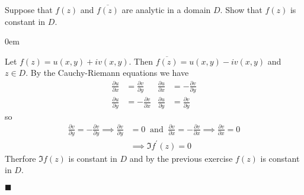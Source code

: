 \documentclass[12pt]{article}
\renewcommand{\qed}{\hfill$\blacksquare$}
\renewenvironment{proof}{\vspace{1em}\begin{addmargin}[2em]{0em}\begin{newproof}}{\end{newproof}\end{addmargin}\qed}
\newenvironment{exercise}[2][Exercise]{\begin{trivlist}
\item[\hskip \labelsep {\bfseries #1} \hskip \labelsep {\bfseries #2.}]}{\end{trivlist}}
\begin{document}
\newpage
\begin{exercise}{11}
	Suppose that $f(z)$ and $\overline{f(z)}$ are analytic in a domain $D$. Show that $f(z)$ is constant in $D$.
\end{exercise}
\begin{proof} Let $f(z) = u(x,y) + iv(x,y)$. Then $\overline{f(z)} = u(x,y) - iv(x,y)$ and $z \in D$. By the Cauchy-Riemann equations we have
	\begin{align*}
		\frac{\partial u}{\partial x} &= \frac{\partial v}{\partial y} & \frac{\partial u}{\partial x} &= -\frac{\partial v}{\partial y} \\
		\frac{\partial u}{\partial y} &= -\frac{\partial v}{\partial x} & \frac{\partial u}{\partial y} &= \frac{\partial v}{\partial y}
	\end{align*}
	so
	\begin{align*}
		\frac{\partial v}{\partial y} = -\frac{\partial v}{\partial y} \implies \frac{\partial v}{\partial y} &= 0 ~ \text{ and } ~ \frac{\partial v}{\partial x} = -\frac{\partial v}{\partial x} \implies \frac{\partial v}{\partial x} = 0 \\
					      &\implies \Im f^{'}(z) = 0
	\end{align*}
	Therfore $\Im f(z)$ is constant in $D$ and by the previous exercise $f(z)$ is constant in $D$.
\end{proof}
\end{document}
